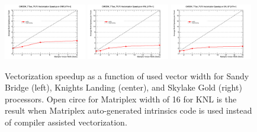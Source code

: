 \documentclass{webofc}
\def\threep{0.32\textwidth}
\def\postfigskip{\vskip-4mm}
\begin{document}
\begin{figure}[htb]
  \centering
  \includegraphics[width=\threep]{figs/comp/SNB_CMSSW_TTbar_PU70_VU_speedup.png}
  \hfill
  \includegraphics[width=\threep]{figs/comp/KNL_CMSSW_TTbar_PU70_VU_speedup.png}
  \hfill
  \includegraphics[width=\threep]{figs/comp/SKL-SP_CMSSW_TTbar_PU70_VU_speedup.png}
  \postfigskip

  \caption{Vectorization speedup as a function of used vector width for Sandy
    Bridge (left), Knights Landing (center), and Skylake Gold (right)
    processors. Open circe for Matriplex width of 16 for KNL is the result
    when Matriplex auto-generated intrinsics code is used instead of compiler
    assisted vectorization.}
  \label{fig:vu-speedup}
\end{figure}
\end{document}
